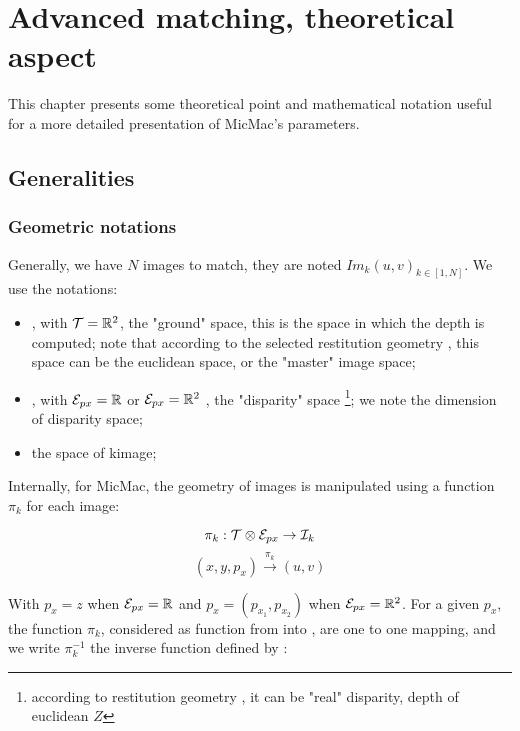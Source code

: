 \chapter{Advanced matching, theoretical aspect}


This chapter presents some theoretical point and mathematical notation
useful for a more detailed presentation of MicMac's parameters.


\section{Generalities}

\subsection{Geometric notations}

Generally, we have $N$ images to match, they are noted $Im_k(u,v)_{k\in [1,N]}$.
We use the notations:


\begin{itemize}
   \item \ETer,  with  $\mathcal T = \mathbb{R} ^2$,  the "ground" space, this is
         the space in which the depth is computed; note that according
         to the selected restitution geometry , this space can be the
         euclidean space, or the "master" image space;


   \item \EPx, with  ${\mathcal E}_{px} = \mathbb{R}$ or   ${\mathcal E}_{px} = \mathbb{R} ^2$ , the "disparity" space
          \footnote{according to restitution geometry , it can be "real" disparity, depth of euclidean $Z$};
          we note  \DimPx the dimension of disparity space;

   \item \EIm the space of  k\KTH image;
\end{itemize}


Internally, for MicMac, the geometry of images is manipulated using
a function  $\pi_k$ for each image:

\begin{equation}
   \pi_k :   \mathcal T \otimes {\mathcal E}_{px} \rightarrow {\mathcal I}_k
\end{equation}
\begin{equation}
              (x,y,p_x)  \stackrel{\pi_k}{\rightarrow}  (u,v)
\end{equation}

With $p_x=z$ when ${\mathcal E}_{px} = \mathbb{R}$ and   $p_x=(p_{x_1},p_{x_2})$
when ${\mathcal E}_{px} = \mathbb{R}^2$. For a given $p_x$, the function $\pi_k$,
considered as function from \ETer into  \EIm, are one to one mapping,
and we write $\pi_k^{-1}$ the inverse function defined by :


